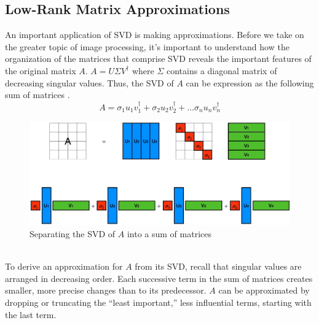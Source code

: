 \documentclass[12pt, reqno]{amsart}
\theoremstyle{definition}
\theoremstyle{remark}
\numberwithin{equation}{section}
\begin{document}
\subsection{Low-Rank Matrix Approximations}
An important application of SVD is making approximations. Before we take on the greater topic of image processing, it’s important to understand how the organization of the matrices that comprise SVD reveals the important features of the original matrix $A$. $A = U \Sigma V^\dagger$ where $\Sigma$ contains a diagonal matrix of decreasing singular values. Thus, the SVD of $A$ can be expression as the following sum of matrices \cite{Serrano}.
\begin{equation}\label{eqlowrank}
    A = \sigma_1 u_1 v_1^\dagger + \sigma_2 u_2 v_2^\dagger + ... \sigma_n u_n v_n^\dagger
\end{equation}
\begin{figure}[h]
    \centering
    \includegraphics[width=0.6\linewidth]{img/lowrankapprox.png}
    \caption{Separating the SVD of $A$ into a sum of matrices}
    \label{fig:lowrank}
\end{figure}\\
To derive an approximation for $A$ from its SVD, recall that singular values are arranged in decreasing order. Each successive term in the sum of matrices creates smaller, more precise changes than to its predecessor. $A$ can be approximated by dropping or truncating the “least important,” less influential terms, starting with the last term.
\end{document}
